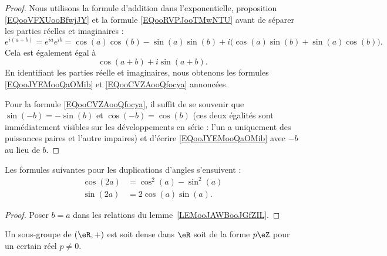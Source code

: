 \begin{proof}
	Nous utilisons la formule d'addition dans l'exponentielle, proposition \eqref{EQooVFXUooBfwjJY} et la formule \eqref{EQooRVPJooTMwNTU} avant de séparer les parties réelles et imaginaires :
	\begin{equation}
		e^{i(a+b)}= e^{ia} e^{ib}=\cos(a)\cos(b)-\sin(a)\sin(b)+i\big( \cos(a)\sin(b)+\sin(a)\cos(b) \big).
	\end{equation}
	Cela est également égal à
	\begin{equation}
		\cos(a+b)+i\sin(a+b).
	\end{equation}
	En identifiant les parties réelle et imaginaires, nous obtenons les formules \eqref{EQooJYEMooQaOMib} et \eqref{EQooCVZAooQfocya} annoncées.

	Pour la formule \eqref{EQooCVZAooQfocya}, il suffit de se souvenir que \( \sin(-b)=-\sin(b)\) et \( \cos(-b)=\cos(b)\) (ces deux égalités sont immédiatement visibles sur les développements en série : l'un a uniquement des puissances paires et l'autre impaires) et d'écrire \eqref{EQooJYEMooQaOMib} avec \( -b\) au lieu de \( b\).
\end{proof}

\begin{corollary}       \label{CORooQZDQooWjMXTF}
	Les formules suivantes pour les duplications d'angles s'ensuivent :
	\begin{subequations}
		\begin{align}
			\cos(2a) & =\cos^2(a)-\sin^2(a)                               \\
			\sin(2a) & =2\cos(a)\sin(a).      \label{SUBEQooLRJDooQuFvux}
		\end{align}
	\end{subequations}
\end{corollary}

\begin{proof}
	Poser \( b=a\) dans les relations du lemme~\ref{LEMooJAWBooJGfZIL}.
\end{proof}

\begin{lemma}       \label{LEMooPQWWooMdPWUT}
	Un sous-groupe de \( (\eR,+)\) est soit dense dans \( \eR\) soit de la forme \( p\eZ\) pour un certain réel \( p\neq 0\).
\end{lemma}

